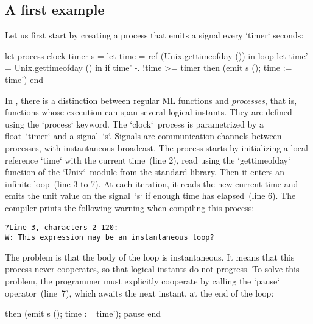 \documentclass[9pt,preprint]{sigplanconf}
\begin{document}
\subsection{A first example}
\label{sec:first_example}

Let us first start by creating a process that emits a signal every `timer` seconds:
%
\begin{rmlcl}
let process clock timer s =
  let time = ref (Unix.gettimeofday ()) in
  loop
    let time' = Unix.gettimeofday () in
    if time' -. !time >= timer
    then (emit s (); time := time')
  end
\end{rmlcl}
%
In \rml, there is a distinction between regular ML functions and \emph{processes}, that is, functions whose execution can span several logical instants.  They are defined using the `process` keyword. The `clock`~process is parametrized by a float~`timer` and a signal~`s`. Signals are communication channels between processes, with instantaneous broadcast. The process starts by initializing a local reference `time` with the current time~(line 2), read using the `gettimeofday` function of the `Unix`~module from the standard library. Then it enters an infinite loop~(line 3 to 7). At each iteration, it reads the new current time and emits the unit value on the signal~`s` if enough time has elapsed~(line 6). The compiler prints the following warning when compiling this process:
\begin{lstlisting}
?Line 3, characters 2-120:
W: This expression may be an instantaneous loop?
\end{lstlisting}
The problem is that the body of the loop is instantaneous. It means that this process never cooperates, so that logical instants do not progress. To solve this problem, the programmer must explicitly cooperate by calling the `pause` operator~(line~7), which awaits the next instant, at the end of the loop:
\begin{rmlcl}[5]
[...]
    then (emit s (); time := time');
    pause 
  end
\end{rmlcl}
\end{document}
